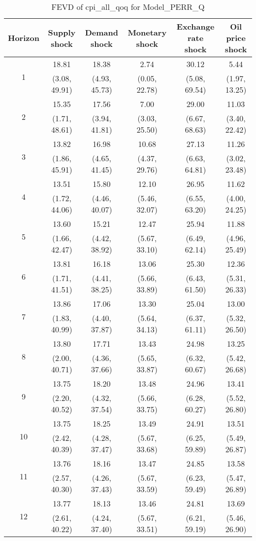 \documentclass{article}
\begin{document}
\begin{table}
	\footnotesize
	\caption{FEVD of cpi_all_qoq for Model_PERR_Q}
	\begin{tabular}{cccccc}
		Horizon & Supply shock & Demand shock & Monetary shock & Exchange rate shock & Oil price shock\\ \hline
		\multirow{2}{*}{1} & 18.81 & 18.38 & 2.74 & 30.12 & 5.44\\
		 & (3.08, 49.91) & (4.93, 45.73) & (0.05, 22.78) & (5.08, 69.54) & (1.97, 13.25)\\
		\multirow{2}{*}{2} & 15.35 & 17.56 & 7.00 & 29.00 & 11.03\\
		 & (1.71, 48.61) & (3.94, 41.81) & (3.03, 25.50) & (6.67, 68.63) & (3.40, 22.42)\\
		\multirow{2}{*}{3} & 13.82 & 16.98 & 10.68 & 27.13 & 11.26\\
		 & (1.86, 45.91) & (4.65, 41.45) & (4.37, 29.76) & (6.63, 64.81) & (3.02, 23.48)\\
		\multirow{2}{*}{4} & 13.51 & 15.80 & 12.10 & 26.95 & 11.62\\
		 & (1.72, 44.06) & (4.46, 40.07) & (5.46, 32.07) & (6.55, 63.20) & (4.00, 24.25)\\
		\multirow{2}{*}{5} & 13.60 & 15.21 & 12.47 & 25.94 & 11.88\\
		 & (1.66, 42.47) & (4.42, 38.92) & (5.67, 33.10) & (6.49, 62.14) & (4.96, 25.49)\\
		\multirow{2}{*}{6} & 13.81 & 16.18 & 13.06 & 25.30 & 12.36\\
		 & (1.71, 41.51) & (4.41, 38.25) & (5.66, 33.89) & (6.43, 61.50) & (5.31, 26.33)\\
		\multirow{2}{*}{7} & 13.86 & 17.06 & 13.30 & 25.04 & 13.00\\
		 & (1.83, 40.99) & (4.40, 37.87) & (5.64, 34.13) & (6.37, 61.11) & (5.32, 26.50)\\
		\multirow{2}{*}{8} & 13.80 & 17.71 & 13.43 & 24.98 & 13.25\\
		 & (2.00, 40.71) & (4.36, 37.66) & (5.65, 33.87) & (6.32, 60.67) & (5.42, 26.68)\\
		\multirow{2}{*}{9} & 13.75 & 18.20 & 13.48 & 24.96 & 13.41\\
		 & (2.20, 40.52) & (4.32, 37.54) & (5.66, 33.75) & (6.28, 60.27) & (5.52, 26.80)\\
		\multirow{2}{*}{10} & 13.75 & 18.25 & 13.49 & 24.91 & 13.51\\
		 & (2.42, 40.39) & (4.28, 37.47) & (5.67, 33.68) & (6.25, 59.89) & (5.49, 26.87)\\
		\multirow{2}{*}{11} & 13.76 & 18.16 & 13.47 & 24.85 & 13.58\\
		 & (2.57, 40.30) & (4.26, 37.43) & (5.67, 33.59) & (6.23, 59.49) & (5.47, 26.89)\\
		\multirow{2}{*}{12} & 13.77 & 18.13 & 13.46 & 24.81 & 13.69\\
		 & (2.61, 40.22) & (4.24, 37.40) & (5.67, 33.51) & (6.21, 59.19) & (5.46, 26.90)\\
	\end{tabular}
\label{tab:fevd-Model_PERR_Q-cpi_all_qoq}
\end{table}
\end{document}
